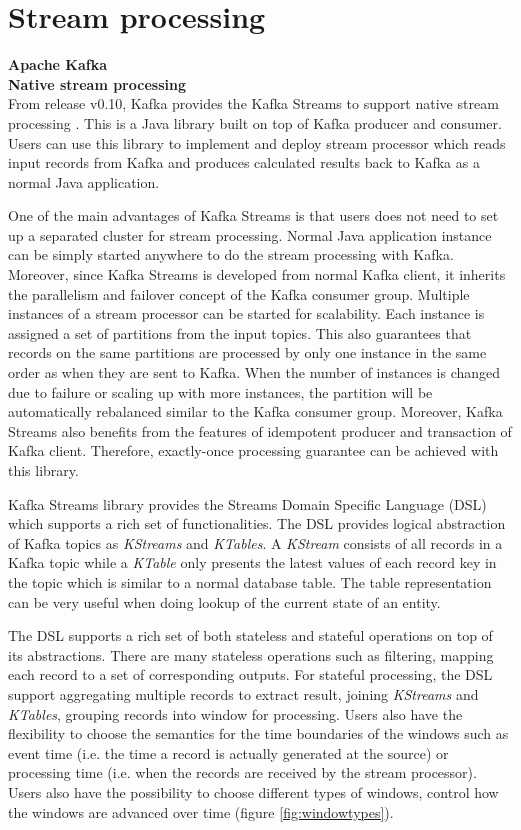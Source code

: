 \section{Stream processing}
\large \textbf{Apache Kafka}\\
\normalsize
\textbf{Native stream processing}\\
From release v0.10, Kafka provides the Kafka Streams to support native stream processing \cite{kafkastreams}. This is a Java library built on top of Kafka producer and consumer. Users can use this library to implement and deploy stream processor which reads input records from Kafka and produces calculated results back to Kafka as a normal Java application. 

One of the main advantages of Kafka Streams is that users does not need to set up a separated cluster for stream processing. Normal Java application instance can be simply started anywhere to do the stream processing with Kafka. Moreover, since Kafka Streams is developed from normal Kafka client, it inherits the parallelism and failover concept of the Kafka consumer group. Multiple instances of a stream processor can be started for scalability. Each instance is assigned a set of partitions from the input topics. This also guarantees that records on the same partitions are processed by only one instance in the same order as when they are sent to Kafka. When the number of instances is changed due to failure or scaling up with more instances, the partition will be automatically rebalanced similar to the Kafka consumer group. Moreover, Kafka Streams also benefits from the features of idempotent producer and transaction of Kafka client. Therefore, exactly-once processing guarantee can be achieved with this library.

Kafka Streams library provides the Streams Domain Specific Language (DSL) which supports a rich set of functionalities. The DSL provides logical abstraction of Kafka topics as \emph{KStreams} and \emph{KTables}. A \emph{KStream} consists of all records in a Kafka topic while a \emph{KTable} only presents the latest values of each record key in the topic which is similar to a normal database table. The table representation can be very useful when doing lookup of the current state of an entity. 

The DSL supports a rich set of both stateless and stateful operations on top of its abstractions. There are many stateless operations such as filtering, mapping each record to a set of corresponding outputs. For stateful processing, the DSL support aggregating multiple records to extract result, joining \emph{KStreams} and \emph{KTables}, grouping records into window for processing. Users also have the flexibility to choose the semantics for the time boundaries of the windows such as event time (i.e. the time a record is actually generated at the source) or processing time (i.e. when the records are received by the stream processor). Users also have the possibility to choose different types of windows, control how the windows are advanced over time (figure \ref{fig:windowtypes}).

